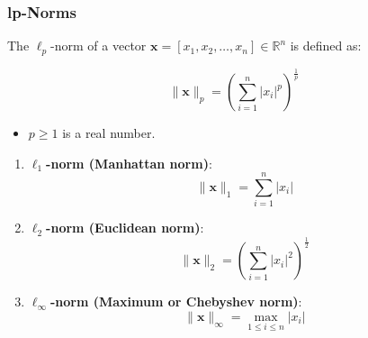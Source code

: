 \subsubsection{lp-Norms}
\begin{definition}
    The \(\ell_p\)-norm of a vector \(\mathbf{x} = [x_1, x_2, \dots, x_n] \in \mathbb{R}^n\) is defined as:

    \begin{equation}
        \|\mathbf{x}\|_p = \left( \sum_{i=1}^{n} |x_i|^p \right)^{\frac{1}{p}}
    \end{equation}

    \begin{itemize}
        \item \(p \geq 1\) is a real number.
    \end{itemize}
    \vspace{1em}

    \begin{enumerate}
        \item \textbf{\(\ell_1\)-norm (Manhattan norm)}:
        \begin{equation}
            \|\mathbf{x}\|_1 = \sum_{i=1}^{n} |x_i|
        \end{equation}
        \item \textbf{\(\ell_2\)-norm (Euclidean norm)}:
        \begin{equation}
            \|\mathbf{x}\|_2 = \left( \sum_{i=1}^{n} |x_i|^2 \right)^{\frac{1}{2}}
        \end{equation}
        \item \textbf{\(\ell_\infty\)-norm (Maximum or Chebyshev norm)}:
        \begin{equation}
            \|\mathbf{x}\|_\infty = \max_{1 \leq i \leq n} |x_i|
        \end{equation}
    \end{enumerate}
\end{definition}

